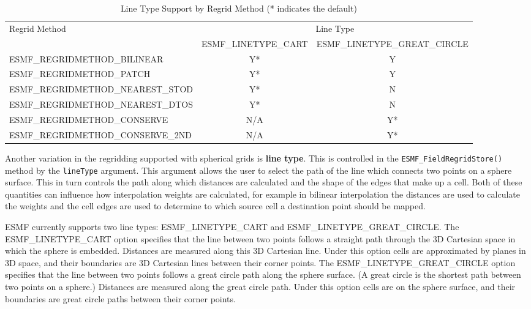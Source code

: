 \begin{table}[ht]
\centering
\vspace{0.2cm}
\begin{tabular}{| l | c | c |}
\hline
Regrid Method & \multicolumn{2}{|c|}{Line Type} \\ 
     &  ESMF\_LINETYPE\_CART & ESMF\_LINETYPE\_GREAT\_CIRCLE \\ 
\hline
 ESMF\_REGRIDMETHOD\_BILINEAR & Y* & Y \\
\hline
 ESMF\_REGRIDMETHOD\_PATCH & Y* & Y \\
\hline
 ESMF\_REGRIDMETHOD\_NEAREST\_STOD & Y* & N \\
\hline
 ESMF\_REGRIDMETHOD\_NEAREST\_DTOS & Y* & N \\
\hline
 ESMF\_REGRIDMETHOD\_CONSERVE & N/A & Y* \\
\hline
 ESMF\_REGRIDMETHOD\_CONSERVE\_2ND & N/A & Y* \\
\hline
\end{tabular}
\label{line_type_support}
\caption{Line Type Support by Regrid Method (* indicates the default)}
\end{table}


 Another variation in the regridding supported with spherical grids is {\bf line type}. This is controlled in the
{\tt ESMF\_FieldRegridStore()} method by the {\tt lineType} argument. This argument allows the user to select the path of the line which connects
two points on a sphere surface. This in turn controls the path along which distances are calculated and the shape of 
the edges that make up a cell. Both of these quantities can influence how interpolation weights are calculated, for example in
bilinear interpolation the distances are used to calculate the weights and the cell edges are used to determine to which source 
cell a destination point should be mapped. 

ESMF currently supports two line types: ESMF\_LINETYPE\_CART and ESMF\_LINETYPE\_GREAT\_CIRCLE. The ESMF\_LINETYPE\_CART option 
specifies that the line between two points follows a straight path through the 3D Cartesian space in which the sphere is embedded.
Distances are measured along 
this 3D Cartesian line. Under this option cells are approximated by planes in 3D space, and their boundaries are 3D Cartesian lines
between their corner points.  The ESMF\_LINETYPE\_GREAT\_CIRCLE option specifies that the line between two points follows
a great circle path along the sphere surface. (A great circle is the shortest path between two points on a sphere.) 
Distances are measured along the great circle path. Under this option cells are on the sphere surface, and their boundaries 
are great circle paths between their corner points. 


